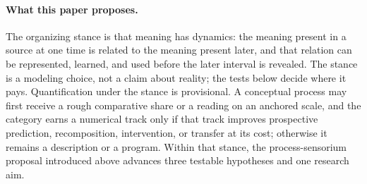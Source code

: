 \documentclass[10pt]{article}
\begin{document}
\paragraph{What this paper proposes.}
The organizing stance is that meaning has dynamics: the meaning present in a
source at one time is related to the meaning present later, and that relation
can be represented, learned, and used before the later interval is revealed.
The stance is a modeling choice, not a claim about reality; the tests below
decide where it pays. Quantification under the stance is provisional. A conceptual
process may first receive a rough comparative share or a reading on an anchored
scale, and the category
earns a numerical track only if that track improves prospective prediction,
recomposition, intervention, or transfer at its cost; otherwise it remains a
description or a program. Within that stance, the process-sensorium proposal
introduced above advances three testable hypotheses
and one research aim.
\end{document}
